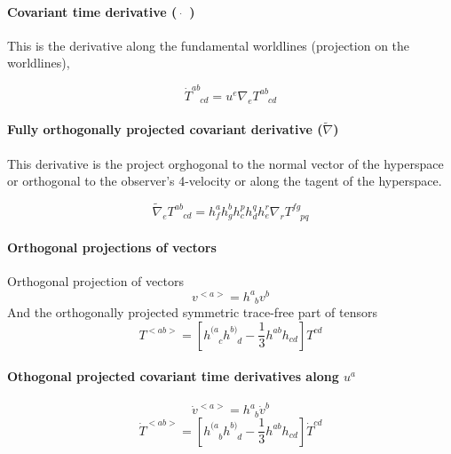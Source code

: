 \paragraph{Covariant time derivative ($\dot \quad$)} This is the derivative along the fundamental worldlines (projection on the worldlines),

\begin{equation}
\dot T^{ab}_{\phantom{ab}cd} = u^e \nabla_e T^{ab}_{\phantom{ab}cd}
\end{equation}


\paragraph{Fully orthogonally projected covariant derivative ($\tilde \nabla$)}  This derivative is the project orghogonal to the normal vector of the hyperspace or orthogonal to the observer's 4-velocity or along the tagent of the hyperspace.

\begin{equation}
	\tilde\nabla_e T^{ab}_{\phantom{ab}cd} = h^a_f h^b_gh^p_ch^q_dh^r_e \nabla_r T^{fg}_{\phantom{fg}pq}
\end{equation}

\paragraph{Orthogonal projections of vectors}
	Orthogonal projection of vectors
\begin{equation}
v^{<a>}	= h^a_{\phantom a b} v^b
\end{equation}
 And the orthogonally projected symmetric trace-free part of tensors
 \begin{equation}
	T^{<ab>} = [h^{(a}_{\phantom {(a} c} h^{b)}_{\phantom{b)}d} - \frac{1}{3} h^{ab} h_{cd} ] T^{cd}
\end{equation}



\paragraph{Othogonal projected covariant time derivatives along $u^a$}
\begin{equation}
	\dot v^{<a>} = h^a_{\phantom a b} \dot v^b
\end{equation}
\begin{equation}
	\dot T^{<ab>} = [ h^{(a}_{\phantom{(a}b} h^{b)}_{\phantom{b)} d} - \frac 1 3 h^{ab}h_{cd} ]\dot T^{cd}
\end{equation}


